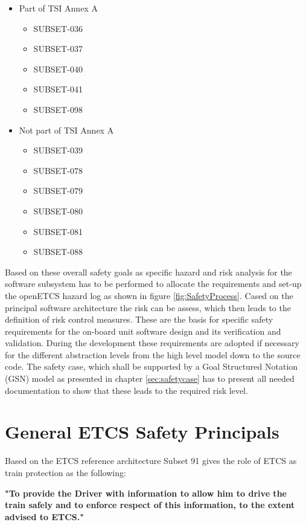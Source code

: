 \documentclass{template/openetcs_report}
\begin{document}
\begin{itemize}
\item Part of TSI Annex A
	\begin{itemize}
	\item SUBSET-036
	\item SUBSET-037
	\item SUBSET-040
	\item SUBSET-041
	\item SUBSET-098
	\end{itemize}
	
\item Not part of TSI Annex A
	\begin{itemize}
	\item SUBSET-039
	\item SUBSET-078
	\item SUBSET-079
	\item SUBSET-080
	\item SUBSET-081
	\item SUBSET-088
	\end{itemize}
\end{itemize}

Based on these overall safety goals as specific hazard and risk analysis for the software subsystem has to be performed to allocate the requirements and set-up the openETCS hazard log as shown in figure \ref{fig:SafetyProcess}. Cased on the principal software architecture the risk can be assess, which then leads to the definition of risk control measures. These are the basis for specific safety requirements for the on-board unit software design and its verification and validation. During the development these requirements are adopted if necessary for the different abstraction levels from the high level model down to the source code. The safety case, which shall be supported by a Goal Structured Notation (GSN) \cite{GSNwebsite} model as presented in chapter \ref{sec:safetycase} has to present all needed documentation to show that these leads to the required risk level.

\section{General ETCS Safety Principals}

Based on the ETCS reference architecture Subset 91 gives the role of ETCS as train protection as the following:

\begin{center}
\textbf{"To provide the Driver with information to allow  him to drive the train safely and to enforce respect of this information, to the extent advised to ETCS."}
\end{center}
\end{document}
